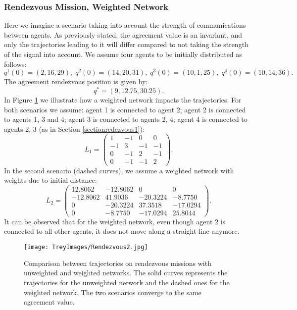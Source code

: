 \documentclass{aims}
\theoremstyle{definition}
\begin{document}
\subsubsection{Rendezvous Mission, Weighted Network}
 Here we imagine a scenario taking into account the strength of communications between agents. As previously stated, the agreement value is an invariant, and only the trajectories leading to it will differ compared to not taking the strength of the signal into account. 
We assume four agents to be initially distributed as follows:
\begin{equation*}
    q^1(0)=(2,16,29)   ,\;q^2(0)=(14,20,31),\; q^3(0)=(10,1,25),\;q^4(0)=(10,14,36).
\end{equation*}
The agreement rendezvous position is given by:
\begin{equation}
    q^*=(9,12.75,30.25).
\end{equation}
In Figure \ref{Fig-rendezvous2} we illustrate how a weighted network impacts the trajectories. For both scenarios we assume: agent 1 is connected to agent 2; agent 2 is connected to agents 1, 3 and 4; agent 3 is connected to agents 2, 4; agent 4 is connected to agents 2, 3 (as in Section \ref{sectionredezvous1}):
\begin{equation}
    L_1=\left(\begin{array}{cccc}1&-1&0&0\\-1&3&-1&-1\\0&-1&2&-1\\0&-1&-1&2\end{array}\right).
\end{equation}
In the second scenario (dashed curves), we assume a weighted network with weights due to initial distance:
\begin{equation}
    L_2=\left(\begin{array}{cccc}12.8062&-12.8062&0&0\\-12.8062&41.9036&-20.3224&-8.7750\\0&-20.3224&37.3518&-17.0294\\0&-8.7750&-17.0294&25.8044\end{array}\right).
\end{equation}
It can be observed that for the weighted network, even though agent 2 is connected to all other agents, it does not move along a straight line anymore. 

\begin{figure}[h!]
\texttt{[image: TreyImages/Rendezvous2.jpg]}
\caption{Comparison between trajectories on rendezvous missions with unweighted  and weighted networks. The solid curves represents the trajectories for the unweighted network and the dashed ones for the weighted network. The two scenarios converge to the same agreement value.}
\label{Fig-rendezvous2}
\end{figure}
\end{document}
